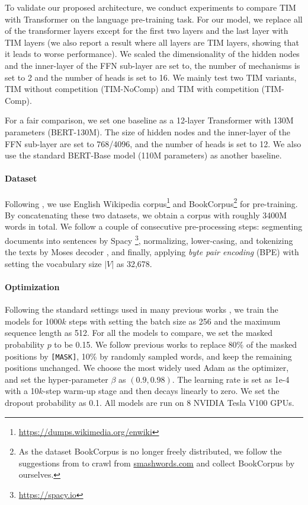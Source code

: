 To validate our proposed architecture, we conduct experiments to compare TIM with Transformer on the language pre-training task. For our model, we replace all of the transformer layers except for the first two layers and the last layer with TIM layers (we also report a result where all layers are TIM layers, showing that it leads to worse performance).  We scaled the dimensionality of the hidden nodes and the inner-layer of the FFN sub-layer are set to, the number of mechanisms is set to 2 and the number of heads is set to 16. We mainly test two TIM variants,  TIM without competition (TIM-NoComp) and TIM with competition (TIM-Comp).

For a fair comparison, we set one baseline as a 12-layer Transformer with 130M parameters (BERT-130M). The size of hidden nodes and the inner-layer of the FFN sub-layer are set to 768/4096, and the number of heads is set to 12. We also use the standard BERT-Base model (110M parameters) as another baseline.


\paragraph{Dataset} 
Following \cite{devlin2018bert}, we use English Wikipedia corpus\footnote{\url{https://dumps.wikimedia.org/enwiki}} and BookCorpus\footnote{As the dataset BookCorpus \citep{moviebook} is no longer freely distributed, we follow the suggestions from \citet{devlin2018bert} to crawl from \url{smashwords.com} and collect BookCorpus by ourselves. } for pre-training. By concatenating these two datasets, we obtain a corpus with roughly 3400M words in total. We follow a couple of consecutive pre-processing steps: segmenting documents into sentences by Spacy \footnote{\url{https://spacy.io}}, normalizing, lower-casing, and tokenizing the texts by Moses decoder \citep{Koehn2007MosesOS}, and finally, applying \textit{byte pair encoding} (BPE) \citep{BPE} with setting the vocabulary size $|V|$ as 32,678.

\paragraph{Optimization}
Following the standard settings used in many previous works \cite{devlin2018bert,liu2019roberta}, we train the models for 1000$k$ steps with setting the batch size as 256 and the maximum sequence length as 512. For all the models to compare, we set the masked probability $p$ to be 0.15. We follow previous works to replace 80\% of the masked positions by \texttt{[MASK]}, 10\% by randomly sampled words, and keep the remaining positions unchanged.  We choose the most widely used Adam \cite{DBLP:journals/corr/KingmaB14} as the optimizer, and set the hyper-parameter $\beta$ as $(0.9,0.98)$. The learning rate is set as 1e-4 with a 10$k$-step warm-up stage and then decays linearly to zero. We set the dropout probability as 0.1.  All models are run on 8 NVIDIA Tesla V100 GPUs. 


